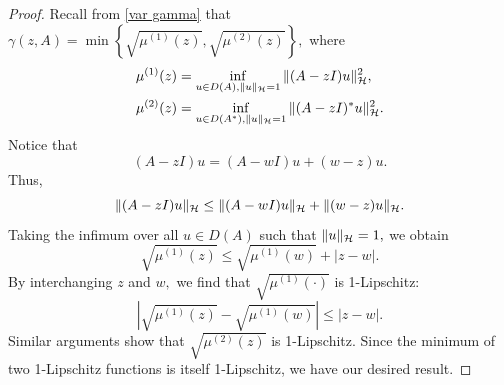 \begin{proof}
    Recall from \eqref{var gamma} that $\gamma(z, A) = \min\left\{ \sqrt{\mu^{(1)}(z)}, \sqrt{\mu^{(2)}(z)} \right\},$ where 
    \begin{align}
    \mu^{(1)}(z) &= \inf_{u \in D(A), \|u\|_{\mathcal{H}}=1} \|(A-zI) u \|_{\mathcal{H}}^2,\\
    \mu^{(2)}(z) &= \inf_{u \in D(A^*), \|u\|_{\mathcal{H}}=1} \|(A-zI)^*u\|_{\mathcal{H}}^2.
    \end{align}
    Notice that 
    \begin{equation}
        (A-zI)u = (A-wI)u + (w-z)u.
    \end{equation}
    Thus, 
    \begin{equation}
        \|(A-zI)u\|_{\mathcal{H}} \le \|(A-wI) u \|_{\mathcal{H}} + \|(w-z) u \|_{\mathcal{H}}.
    \end{equation}
    Taking the infimum over all $u \in D(A)$ such that $\|u\|_{\mathcal{H}}=1,$ we obtain
    \begin{equation} \label{g1w}
        \sqrt{\mu^{(1)}(z)} \le \sqrt{\mu^{(1)}(w)} + |z-w|.
    \end{equation}
    By interchanging $z$ and $w,$ we find that $\sqrt{\mu^{(1)}(\cdot)}$ is 1-Lipschitz:
    \begin{equation}
        \left| \sqrt{\mu^{(1)}(z)} - \sqrt{\mu^{(1)}(w)} \right| \le |z-w|.
    \end{equation}
    Similar arguments show that $\sqrt{\mu^{(2)}(z)}$ is 1-Lipschitz. 
    Since the minimum of two 1-Lipschitz functions is itself 1-Lipschitz, we have our desired result. 
\end{proof}

